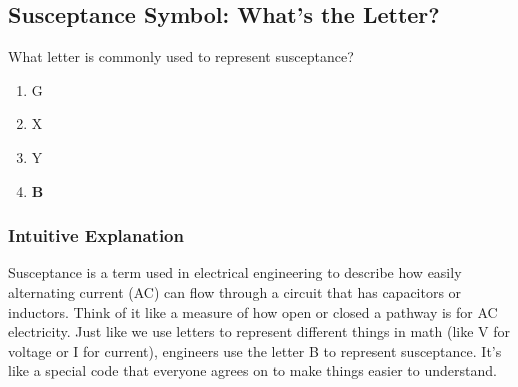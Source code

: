 \subsection{Susceptance Symbol: What’s the Letter?}

\begin{tcolorbox}[colback=gray!10!white,colframe=black!75!black,title=E5B02] What letter is commonly used to represent susceptance?
    \begin{enumerate}[label=\Alph*.]
        \item G
        \item X
        \item Y
        \item \textbf{B}
    \end{enumerate}
\end{tcolorbox}

\subsubsection*{Intuitive Explanation}
Susceptance is a term used in electrical engineering to describe how easily alternating current (AC) can flow through a circuit that has capacitors or inductors. Think of it like a measure of how open or closed a pathway is for AC electricity. Just like we use letters to represent different things in math (like V for voltage or I for current), engineers use the letter B to represent susceptance. It’s like a special code that everyone agrees on to make things easier to understand.

